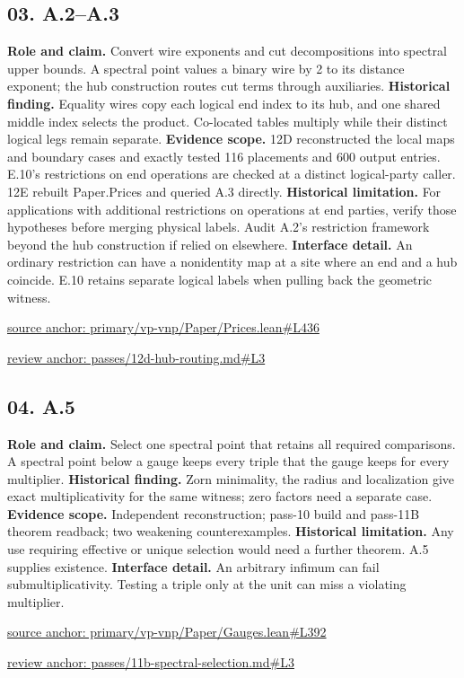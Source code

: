 \documentclass[11pt,letterpaper]{article}
\theoremstyle{definition}\newtheorem{definition}[theorem]{Definition}\newtheorem{example}[theorem]{Example}
\theoremstyle{remark}\newtheorem{remark}[theorem]{Remark}
\begin{document}
\subsection*{03. A.2–A.3}
\textbf{Role and claim.} Convert wire exponents and cut decompositions into spectral upper bounds. A spectral point values a binary wire by 2 to its distance exponent; the hub construction routes cut terms through auxiliaries.
\textbf{Historical finding.} Equality wires copy each logical end index to its hub, and one shared middle index selects the product. Co-located tables multiply while their distinct logical legs remain separate.
\textbf{Evidence scope.} 12D reconstructed the local maps and boundary cases and exactly tested 116 placements and 600 output entries. E.10's restrictions on end operations are checked at a distinct logical-party caller. 12E rebuilt Paper.Prices and queried A.3 directly.
\textbf{Historical limitation.} For applications with additional restrictions on operations at end parties, verify those hypotheses before merging physical labels. Audit A.2's restriction framework beyond the hub construction if relied on elsewhere.
\textbf{Interface detail.} An ordinary restriction can have a nonidentity map at a site where an end and a hub coincide. E.10 retains separate logical labels when pulling back the geometric witness.
\par\href{https://github.com/nousentllc/VP-VNP-Review/blob/8a7976933b6b2b4ffda1ad3a0dfb5fc6b6f023e8/primary/vp-vnp/Paper/Prices.lean\#L436}{source anchor: primary/vp-vnp/Paper/Prices.lean\#L436}
\par\href{https://github.com/nousentllc/VP-VNP-Review/blob/8a7976933b6b2b4ffda1ad3a0dfb5fc6b6f023e8/passes/12d-hub-routing.md\#L3}{review anchor: passes/12d-hub-routing.md\#L3}
\goodbreak
{}
\hypertarget{claim.04}{}
\subsection*{04. A.5}
\textbf{Role and claim.} Select one spectral point that retains all required comparisons. A spectral point below a gauge keeps every triple that the gauge keeps for every multiplier.
\textbf{Historical finding.} Zorn minimality, the radius and localization give exact multiplicativity for the same witness; zero factors need a separate case.
\textbf{Evidence scope.} Independent reconstruction; pass-10 build and pass-11B theorem readback; two weakening counterexamples.
\textbf{Historical limitation.} Any use requiring effective or unique selection would need a further theorem. A.5 supplies existence.
\textbf{Interface detail.} An arbitrary infimum can fail submultiplicativity. Testing a triple only at the unit can miss a violating multiplier.
\par\href{https://github.com/nousentllc/VP-VNP-Review/blob/8a7976933b6b2b4ffda1ad3a0dfb5fc6b6f023e8/primary/vp-vnp/Paper/Gauges.lean\#L392}{source anchor: primary/vp-vnp/Paper/Gauges.lean\#L392}
\par\href{https://github.com/nousentllc/VP-VNP-Review/blob/8a7976933b6b2b4ffda1ad3a0dfb5fc6b6f023e8/passes/11b-spectral-selection.md\#L3}{review anchor: passes/11b-spectral-selection.md\#L3}
\goodbreak
{}
\hypertarget{claim.05}{}
\end{document}
